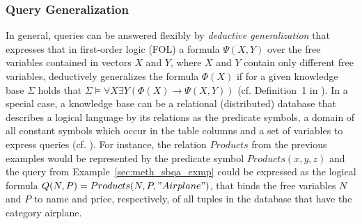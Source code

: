 \subsubsection{Query Generalization}
\label{sec:meth_fqa_qgen}
In general, queries can be answered flexibly by \emph{deductive generalization} \citep{Gaasterland1992, Wiese2014} that expresses that in first-order logic
(FOL) a formula $\Psi(X,Y)$ over the free variables contained in vectors $X$ and $Y$, where $X$ and $Y$ contain only different free variables, deductively
generalizes the formula $\Phi(X)$ if for a given knowledge base $\Sigma$ holds that $\Sigma \vDash \forall X \exists Y (\Phi(X) \to \Psi(X,Y))$ 
(cf. Definition~1 in \cite{Wiese2014}). In a special case, a knowledge base can be a relational (distributed) database that describes a logical language by
its relations as the predicate symbols, a domain of all constant symbols which occur in the table columns and a set of variables to express queries 
(cf. \cite{Wiese2014}). For instance, the relation $Products$ from the previous examples would be represented by the predicate symbol $Products(x,y,z)$
and the query from Example~\ref{sec:meth_sbqa_exmp} could be expressed as the logical formula $Q(N,P)=Products(N,P,"Airplane")$, that binds the free 
variables $N$ and $P$ to name and price, respectively, of all tuples in the database that have the category airplane. 

